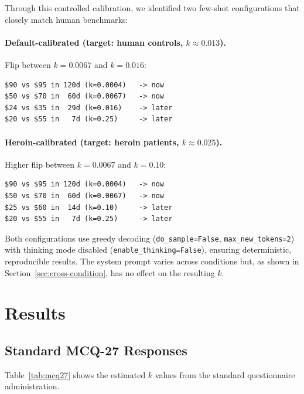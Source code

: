 \documentclass[11pt,a4paper]{article}
\begin{document}
Through this controlled calibration, we identified two few-shot configurations that closely match human benchmarks:

\paragraph{Default-calibrated (target: human controls, $k \approx 0.013$).} Flip between $k = 0.0067$ and $k = 0.016$:
\begin{lstlisting}[style=cot]
$90 vs $95 in 120d (k=0.0004)   -> now
$50 vs $70 in  60d (k=0.0067)   -> now
$24 vs $35 in  29d (k=0.016)    -> later
$20 vs $55 in   7d (k=0.25)     -> later
\end{lstlisting}

\paragraph{Heroin-calibrated (target: heroin patients, $k \approx 0.025$).} Higher flip between $k = 0.0067$ and $k = 0.10$:
\begin{lstlisting}[style=cot]
$90 vs $95 in 120d (k=0.0004)   -> now
$50 vs $70 in  60d (k=0.0067)   -> now
$25 vs $60 in  14d (k=0.10)     -> later
$20 vs $55 in   7d (k=0.25)     -> later
\end{lstlisting}

\noindent Both configurations use greedy decoding (\texttt{do\_sample=False}, \texttt{max\_new\_tokens=2}) with thinking mode disabled (\texttt{enable\_thinking=False}), ensuring deterministic, reproducible results. The system prompt varies across conditions but, as shown in Section~\ref{sec:cross-condition}, has no effect on the resulting $k$.

\section{Results}

\subsection{Standard MCQ-27 Responses}

Table~\ref{tab:mcq27} shows the estimated $k$ values from the standard questionnaire administration.
\end{document}
